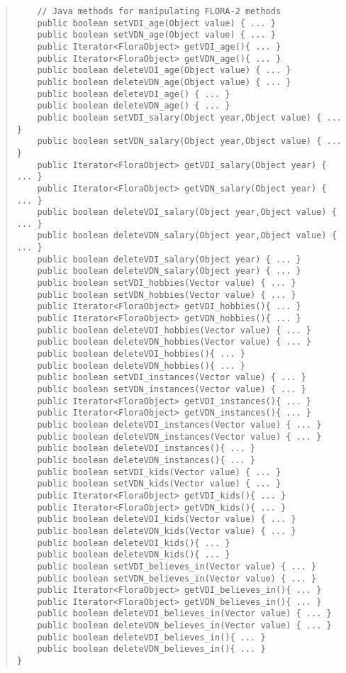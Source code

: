 \begin{quote}
\begin{verbatim}
    // Java methods for manipulating FLORA-2 methods
    public boolean setVDI_age(Object value) { ... }
    public boolean setVDN_age(Object value) { ... }
    public Iterator<FloraObject> getVDI_age(){ ... }
    public Iterator<FloraObject> getVDN_age(){ ... }
    public boolean deleteVDI_age(Object value) { ... }
    public boolean deleteVDN_age(Object value) { ... }
    public boolean deleteVDI_age() { ... }
    public boolean deleteVDN_age() { ... }
    public boolean setVDI_salary(Object year,Object value) { ... }
    public boolean setVDN_salary(Object year,Object value) { ... }
    public Iterator<FloraObject> getVDI_salary(Object year) { ... }
    public Iterator<FloraObject> getVDN_salary(Object year) { ... }
    public boolean deleteVDI_salary(Object year,Object value) { ... }
    public boolean deleteVDN_salary(Object year,Object value) { ... }
    public boolean deleteVDI_salary(Object year) { ... }
    public boolean deleteVDN_salary(Object year) { ... }
    public boolean setVDI_hobbies(Vector value) { ... }
    public boolean setVDN_hobbies(Vector value) { ... }
    public Iterator<FloraObject> getVDI_hobbies(){ ... }
    public Iterator<FloraObject> getVDN_hobbies(){ ... }
    public boolean deleteVDI_hobbies(Vector value) { ... }
    public boolean deleteVDN_hobbies(Vector value) { ... }
    public boolean deleteVDI_hobbies(){ ... }
    public boolean deleteVDN_hobbies(){ ... }
    public boolean setVDI_instances(Vector value) { ... }
    public boolean setVDN_instances(Vector value) { ... }
    public Iterator<FloraObject> getVDI_instances(){ ... }
    public Iterator<FloraObject> getVDN_instances(){ ... }
    public boolean deleteVDI_instances(Vector value) { ... }
    public boolean deleteVDN_instances(Vector value) { ... }
    public boolean deleteVDI_instances(){ ... }
    public boolean deleteVDN_instances(){ ... }
    public boolean setVDI_kids(Vector value) { ... }
    public boolean setVDN_kids(Vector value) { ... }
    public Iterator<FloraObject> getVDI_kids(){ ... }
    public Iterator<FloraObject> getVDN_kids(){ ... }
    public boolean deleteVDI_kids(Vector value) { ... }
    public boolean deleteVDN_kids(Vector value) { ... }
    public boolean deleteVDI_kids(){ ... }
    public boolean deleteVDN_kids(){ ... }
    public boolean setVDI_believes_in(Vector value) { ... }
    public boolean setVDN_believes_in(Vector value) { ... }
    public Iterator<FloraObject> getVDI_believes_in(){ ... }
    public Iterator<FloraObject> getVDN_believes_in(){ ... }
    public boolean deleteVDI_believes_in(Vector value) { ... }
    public boolean deleteVDN_believes_in(Vector value) { ... }
    public boolean deleteVDI_believes_in(){ ... }
    public boolean deleteVDN_believes_in(){ ... }
}
\end{verbatim}
\end{quote}

